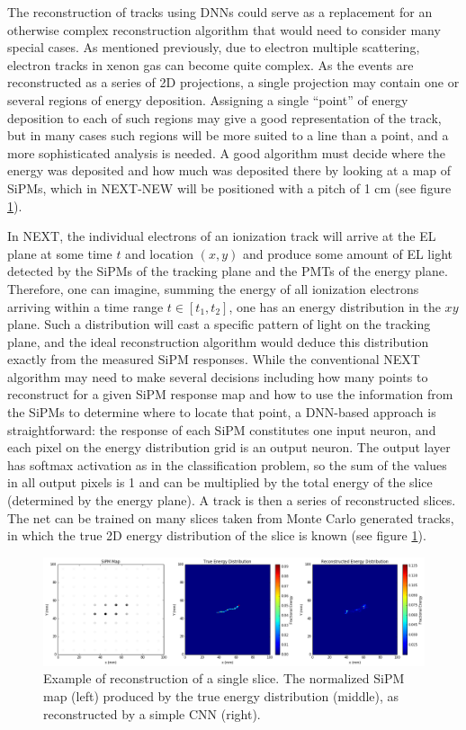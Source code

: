 \documentclass[11pt,a4paper]{article}
\begin{document}
The reconstruction of tracks using DNNs could serve as a replacement for an otherwise complex reconstruction algorithm that would need to consider many special cases. As mentioned previously, due to electron multiple scattering, electron tracks in xenon gas can become quite complex. As the events are reconstructed as a series of 2D projections, a single projection may contain one or several regions of energy deposition. Assigning a single ``point'' of energy deposition to each of such regions may give a good representation of the track, but in many cases such regions will be more suited to a line than a point, and a more sophisticated analysis is needed. A good algorithm must decide where the energy was deposited and how much was deposited there by looking at a map of SiPMs, which in NEXT-NEW will be positioned with a pitch of 1 cm (see figure \ref{fig.reconst_example}).

In NEXT, the individual electrons of an ionization track will arrive at the EL plane at some time $t$ and location $(x,y)$ and produce some amount of EL light detected by the SiPMs of the tracking plane and the PMTs of the energy plane. Therefore, one can imagine, summing the energy of all ionization electrons arriving within a time range $t \in [t_1,t_2]$, one has an energy distribution in the $xy$ plane. Such a distribution will cast a specific pattern of light on the tracking plane, and the ideal reconstruction algorithm would deduce this distribution exactly from the measured SiPM responses. While the conventional NEXT algorithm may need to make several decisions including how many points to reconstruct for a given SiPM response map and how to use the information from the SiPMs to determine where to locate that point, a DNN-based approach is straightforward: the response of each SiPM constitutes one input neuron, and each pixel on the energy distribution grid is an output neuron. The output layer has softmax activation as in the classification problem, so the sum of the values in all output pixels is 1 and can be multiplied by the total energy of the slice (determined by the energy plane). A track is then a series of reconstructed slices. The net can be trained on many slices taken from Monte Carlo generated tracks, in which the true 2D energy distribution of the slice is known (see figure \ref{fig.reconst_example}).

\begin{figure}[!htb]
	\centering
	\includegraphics[scale=0.41]{fig/reconst_example_evt1.png}
	\caption{\label{fig.reconst_example}Example of reconstruction of a single slice. The normalized SiPM map (left) produced by the true energy distribution (middle), as reconstructed by a simple CNN (right).}
\end{figure}
\end{document}
